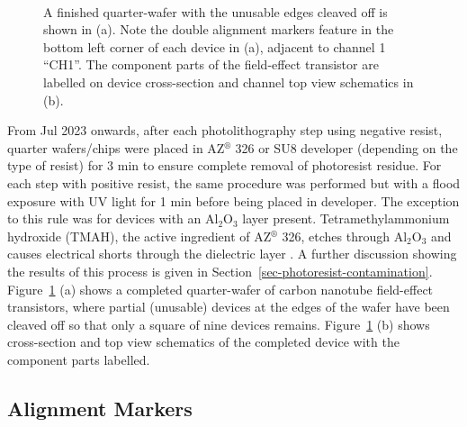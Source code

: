 \documentclass[
  a4paper,
]{scrbook}
\begin{document}
\begin{figure}
\begin{minipage}[t]{0.45\linewidth}
{{}

}

\end{minipage}%
%
\begin{minipage}[t]{0.01\linewidth}

{\centering 

~

}

\end{minipage}%

\caption[A quarter-wafer of devices next to a schematic of a
field-effect transistor
post-fabrication.]{\label{fig-field-effect-transistor}A finished
quarter-wafer with the unusable edges cleaved off is shown in (a). Note
the double alignment markers feature in the bottom left corner of each
device in (a), adjacent to channel 1 ``CH1''. The component parts of the
field-effect transistor are labelled on device cross-section and channel
top view schematics in (b).}

\end{figure}

From Jul 2023 onwards, after each photolithography step using negative
resist, quarter wafers/chips were placed in AZ\(^\circledR\) 326 or SU8
developer (depending on the type of resist) for 3 min to ensure complete
removal of photoresist residue. For each step with positive resist, the
same procedure was performed but with a flood exposure with UV light for
1 min before being placed in developer. The exception to this rule was
for devices with an Al\(_2\)O\(_3\) layer present. Tetramethylammonium
hydroxide (TMAH), the active ingredient of AZ\(^\circledR\) 326, etches
through Al\(_2\)O\(_3\) and causes electrical shorts through the
dielectric layer \autocite{Oh2011,Ali2021}. A further discussion showing
the results of this process is given in
Section~\ref{sec-photoresist-contamination}.
Figure~\ref{fig-field-effect-transistor} (a) shows a completed
quarter-wafer of carbon nanotube field-effect transistors, where partial
(unusable) devices at the edges of the wafer have been cleaved off so
that only a square of nine devices remains.
Figure~\ref{fig-field-effect-transistor} (b) shows cross-section and top
view schematics of the completed device with the component parts
labelled.

\hypertarget{sec-align}{%
\subsection{Alignment Markers}\label{sec-align}}
\end{document}
